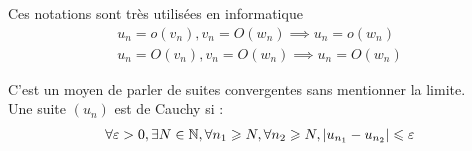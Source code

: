 \begin{remarque}
Ces notations sont très utilisées en informatique
\begin{align*}
    u_n = o(v_n), v_n = O(w_n) \implies u_n = o(w_n) \\
    u_n = O(v_n), v_n = O(w_n) \implies u_n = O(w_n)
\end{align*}
\end{remarque}

\begin{definition}
C'est un moyen de parler de suites convergentes sans mentionner la limite. \\
Une suite $(u_n)$ est de Cauchy si :
\begin{align*}
    \forall \varepsilon > 0, \exists N \in \mathbb{N}, \forall n_1 \geqslant N, \forall n_2 \geqslant N, |u_{n_1} - u_{n_2}| \leqslant \varepsilon
\end{align*}
\end{definition}


